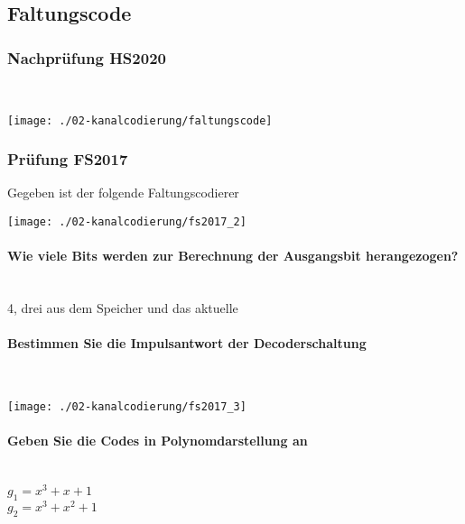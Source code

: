 \subsection{Faltungscode}
\subsubsection{Nachprüfung HS2020}\mbox{}\\
\begin{center}
    \vspace{-8pt}
    \texttt{[image: ./02-kanalcodierung/faltungscode]}
    \vspace{-8pt}
\end{center}

\subsubsection{Prüfung FS2017}
Gegeben ist der folgende Faltungscodierer
\begin{center}
    \vspace{-8pt}
    \texttt{[image: ./02-kanalcodierung/fs2017\_2]}
    \vspace{-8pt}
\end{center}

\paragraph{Wie viele Bits werden zur Berechnung der Ausgangsbit herangezogen?}\mbox{}\\
4, drei aus dem Speicher und das aktuelle


\paragraph{Bestimmen Sie die Impulsantwort der Decoderschaltung}\mbox{}\\
\begin{center}
    \vspace{-8pt}
    \texttt{[image: ./02-kanalcodierung/fs2017\_3]}
    \vspace{-8pt}
\end{center}

\paragraph{Geben Sie die Codes in Polynomdarstellung an}\mbox{}\\
$g_1=x^3+x+1$\\
$g_2=x^3+x^2+1$

